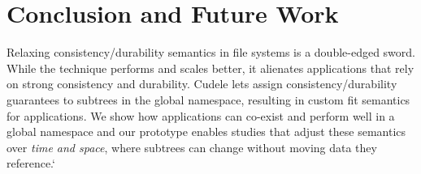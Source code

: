 %
%
%
%
%
%
%

\section{Conclusion and Future Work}

Relaxing consistency/durability semantics in file systems is a double-edged
sword. While the technique performs and scales better, it alienates applications that rely
on strong consistency and durability.  Cudele lets
 assign consistency/durability
guarantees to subtrees in the global namespace, resulting in 
custom fit semantics for applications. We show how applications can co-exist and
perform well in a global namespace and our prototype enables studies that
adjust these semantics over {\it time and space}, where subtrees can change
without moving data they reference.`

